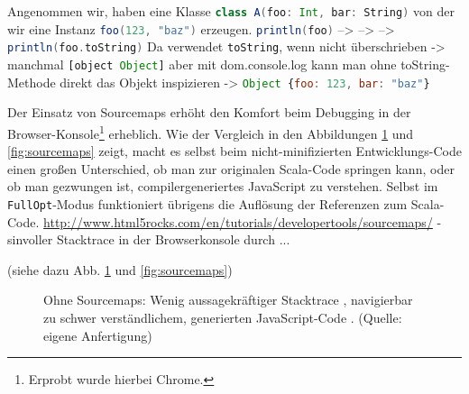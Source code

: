\documentclass[a4paper, 12pt, hidelinks, listof=totoc, listoftables=totoc, bibliography=totoc]{scrreprt}
\newcommand{\code}[1]{\lstinline[language=Scala, style=inline]|#1|}
\newcommand{\scala}[1]{\lstinline[language=Scala, style=inline]|#1|}
\newcommand{\js}[1]{\lstinline[language=JavaScript, style=inline]|#1|}
\begin{document}
Angenommen wir, haben eine Klasse \scala{class A(foo: Int, bar: String)} von der wir eine Instanz \scala{foo(123, "baz")} erzeugen. \scala{println(foo)} --> --> --> \scala{println(foo.toString)}
Da verwendet \scala{toString}, wenn nicht überschrieben -> manchmal \js{[object Object]}
aber mit dom.console.log kann man ohne toString-Methode direkt das Objekt inspizieren -> \js{Object {foo: 123, bar: "baz"}}

Der Einsatz von Sourcemaps erhöht den Komfort beim Debugging in der Browser-Konsole\footnote{Erprobt wurde hierbei Chrome.} erheblich. Wie der Vergleich in den Abbildungen \ref{fig:no-sourcemaps} und \ref{fig:sourcemaps} zeigt, macht es selbst beim nicht-minifizierten Entwicklungs-Code einen großen Unterschied, ob man zur originalen Scala-Code springen kann, oder ob man gezwungen ist, compilergeneriertes JavaScript zu verstehen. Selbst im \code{FullOpt}-Modus funktioniert übrigens die Auflösung der Referenzen zum Scala-Code.
\url{http://www.html5rocks.com/en/tutorials/developertools/sourcemaps/}
	- sinvoller Stacktrace in der Browserkonsole durch ...
	
	(siehe dazu Abb. \ref{fig:no-sourcemaps} und \ref{fig:sourcemaps})

\begin{figure}[!h]
	\centering
	\caption{Ohne Sourcemaps: Wenig aussagekräftiger Stacktrace \protect{}, navigierbar zu schwer verständlichem, generierten JavaScript-Code \protect{}. (Quelle: eigene Anfertigung)}
	\label{fig:no-sourcemaps}
\end{figure}
\end{document}
